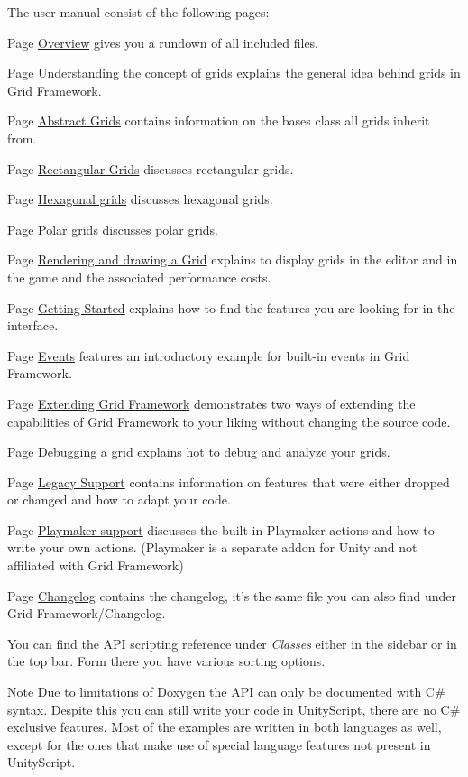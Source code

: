 The user manual consist of the following pages\+:
\begin{DoxyItemize}
\item Page \hyperlink{overview}{Overview} gives you a rundown of all included files.
\item Page \hyperlink{concept_of_grid}{Understanding the concept of grids} explains the general idea behind grids in Grid Framework.
\item Page \hyperlink{abstract_grids}{Abstract Grids} contains information on the bases class all grids inherit from.
\item Page \hyperlink{rectangular_grid}{Rectangular Grids} discusses rectangular grids.
\item Page \hyperlink{hex_grid}{Hexagonal grids} discusses hexagonal grids.
\item Page \hyperlink{polar_grid}{Polar grids} discusses polar grids.
\item Page \hyperlink{rendering_drawing}{Rendering and drawing a Grid} explains to display grids in the editor and in the game and the associated performance costs.
\item Page \hyperlink{getting_started}{Getting Started} explains how to find the features you are looking for in the interface.
\item Page \hyperlink{events}{Events} features an introductory example for built-\/in events in Grid Framework.
\item Page \hyperlink{extending}{Extending Grid Framework} demonstrates two ways of extending the capabilities of Grid Framework to your liking without changing the source code.
\item Page \hyperlink{debugging}{Debugging a grid} explains hot to debug and analyze your grids.
\item Page \hyperlink{legacy_support}{Legacy Support} contains information on features that were either dropped or changed and how to adapt your code.
\item Page \hyperlink{playmaker_support}{Playmaker support} discusses the built-\/in Playmaker actions and how to write your own actions. (Playmaker is a separate addon for Unity and not affiliated with Grid Framework)
\item Page \hyperlink{changelog}{Changelog} contains the changelog, it's the same file you can also find under Grid Framework/\+Changelog.
\end{DoxyItemize}

You can find the A\+P\+I scripting reference under {\itshape Classes} either in the sidebar or in the top bar. Form there you have various sorting options.

\begin{DoxyNote}{Note}
Due to limitations of Doxygen the A\+P\+I can only be documented with C\# syntax. Despite this you can still write your code in Unity\+Script, there are no C\# exclusive features. Most of the examples are written in both languages as well, except for the ones that make use of special language features not present in Unity\+Script. 
\end{DoxyNote}
